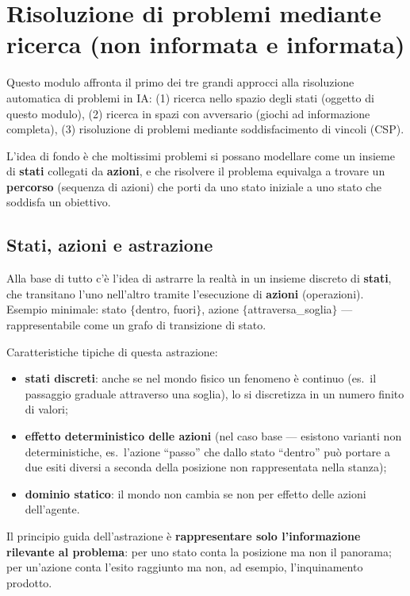 \documentclass[11pt,a4paper]{report}
\begin{document}
\chapter{Risoluzione di problemi mediante ricerca (non informata e informata)}

Questo modulo affronta il primo dei tre grandi approcci alla risoluzione automatica di problemi in IA: (1) ricerca nello spazio degli stati (oggetto di questo modulo), (2) ricerca in spazi con avversario (giochi ad informazione completa), (3) risoluzione di problemi mediante soddisfacimento di vincoli (CSP).

L'idea di fondo è che moltissimi problemi si possano modellare come un insieme di \textbf{stati} collegati da \textbf{azioni}, e che risolvere il problema equivalga a trovare un \textbf{percorso} (sequenza di azioni) che porti da uno stato iniziale a uno stato che soddisfa un obiettivo.

\section{Stati, azioni e astrazione}

Alla base di tutto c'è l'idea di astrarre la realtà in un insieme discreto di \textbf{stati}, che transitano l'uno nell'altro tramite l'esecuzione di \textbf{azioni} (operazioni). Esempio minimale: stato $\{$dentro, fuori$\}$, azione $\{$attraversa\_soglia$\}$ --- rappresentabile come un grafo di transizione di stato.

Caratteristiche tipiche di questa astrazione:
\begin{itemize}
  \item \textbf{stati discreti}: anche se nel mondo fisico un fenomeno è continuo (es.\ il passaggio graduale attraverso una soglia), lo si discretizza in un numero finito di valori;
  \item \textbf{effetto deterministico delle azioni} (nel caso base --- esistono varianti non deterministiche, es.\ l'azione ``passo'' che dallo stato ``dentro'' può portare a due esiti diversi a seconda della posizione non rappresentata nella stanza);
  \item \textbf{dominio statico}: il mondo non cambia se non per effetto delle azioni dell'agente.
\end{itemize}

Il principio guida dell'astrazione è \textbf{rappresentare solo l'informazione rilevante al problema}: per uno stato conta la posizione ma non il panorama; per un'azione conta l'esito raggiunto ma non, ad esempio, l'inquinamento prodotto.
\end{document}
